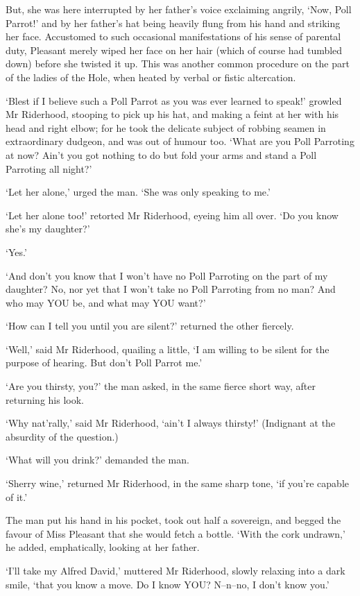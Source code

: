 But, she was here interrupted by her father’s voice exclaiming angrily,
‘Now, Poll Parrot!’ and by her father’s hat being heavily flung from his
hand and striking her face. Accustomed to such occasional manifestations
of his sense of parental duty, Pleasant merely wiped her face on her
hair (which of course had tumbled down) before she twisted it up. This
was another common procedure on the part of the ladies of the Hole, when
heated by verbal or fistic altercation.

‘Blest if I believe such a Poll Parrot as you was ever learned to
speak!’ growled Mr Riderhood, stooping to pick up his hat, and making
a feint at her with his head and right elbow; for he took the delicate
subject of robbing seamen in extraordinary dudgeon, and was out of
humour too. ‘What are you Poll Parroting at now? Ain’t you got nothing
to do but fold your arms and stand a Poll Parroting all night?’

‘Let her alone,’ urged the man. ‘She was only speaking to me.’

‘Let her alone too!’ retorted Mr Riderhood, eyeing him all over. ‘Do you
know she’s my daughter?’

‘Yes.’

‘And don’t you know that I won’t have no Poll Parroting on the part of
my daughter? No, nor yet that I won’t take no Poll Parroting from no
man? And who may YOU be, and what may YOU want?’

‘How can I tell you until you are silent?’ returned the other fiercely.

‘Well,’ said Mr Riderhood, quailing a little, ‘I am willing to be silent
for the purpose of hearing. But don’t Poll Parrot me.’

‘Are you thirsty, you?’ the man asked, in the same fierce short way,
after returning his look.

‘Why nat’rally,’ said Mr Riderhood, ‘ain’t I always thirsty!’ (Indignant
at the absurdity of the question.)

‘What will you drink?’ demanded the man.

‘Sherry wine,’ returned Mr Riderhood, in the same sharp tone, ‘if you’re
capable of it.’

The man put his hand in his pocket, took out half a sovereign, and
begged the favour of Miss Pleasant that she would fetch a bottle. ‘With
the cork undrawn,’ he added, emphatically, looking at her father.

‘I’ll take my Alfred David,’ muttered Mr Riderhood, slowly relaxing into
a dark smile, ‘that you know a move. Do I know YOU? N--n--no, I don’t
know you.’

